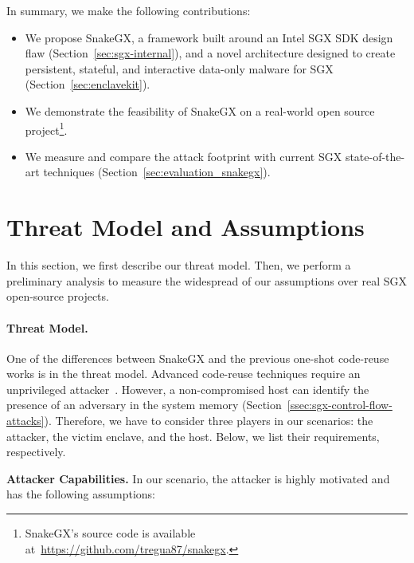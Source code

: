 In summary, we make the following contributions:
\begin{itemize}
	\item We propose SnakeGX, a framework built around an Intel SGX 
	SDK design flaw (Section~\ref{sec:sgx-internal}), and a novel architecture
	designed to create persistent, stateful, and interactive data-only
	malware for SGX (Section~\ref{sec:enclavekit}).
	\item We demonstrate the feasibility of SnakeGX on a real-world
	open source project\footnote{SnakeGX's source code is available 
		at~\url{https://github.com/tregua87/snakegx}.}.
	\item We measure and compare the attack footprint with current SGX 
	state-of-the-art techniques (Section~\ref{sec:evaluation_snakegx}).
\end{itemize}


\section{Threat Model and Assumptions}
\label{sec:threat-model_snakegx}

In this section, we first describe our threat model.
Then, we perform a preliminary analysis to measure the widespread of our 
assumptions over real SGX open-source projects.

\paragraph{Threat Model.}
One of the differences between SnakeGX and the previous one-shot code-reuse 
works is in the threat model.
Advanced code-reuse techniques require an unprivileged 
attacker~\citep{biondo2018guard}.
However, a non-compromised host can identify the presence of an adversary
in the system memory (Section~\ref{ssec:sgx-control-flow-attacks}).
Therefore, we have to consider three players in our scenarios: the attacker, 
the victim enclave, and the host.
Below, we list their requirements, respectively.


\vspace{0.5cm}
\textbf{Attacker Capabilities.}
In our scenario, the attacker is highly motivated and has the following 
assumptions:

